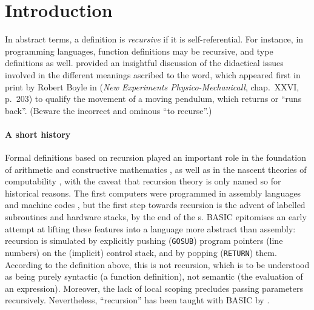 \documentclass[11pt,a4paper]{article}
\newcommand\plang[1]{\textsf{#1}\xspace}
\newcommand\exc[1]{\texttt{\small #1}}
\begin{document}
\section*{Introduction}

In abstract terms, a definition is \emph{recursive} if it is
self\hyp{}referential. For instance, in programming languages,
function definitions may be recursive, and type definitions as
well. \textcite{Giveon:1990} provided an insightful discussion of the
didactical issues involved in the different meanings ascribed to the
word, which appeared first in print by Robert Boyle in
 (\emph{New Experiments Physico\hyp{}Mechanicall},
chap.~XXVI, p.~203) to qualify the movement of a moving pendulum,
which returns or ``runs back''. (Beware the incorrect and ominous ``to
recurse''.)

\paragraph{A short history}

Formal definitions based on recursion played an important role in the
foundation of arithmetic \citep{Peano:1889} and constructive
mathematics \citep{Skolem:1923,Robinson:1947,Robinson:1948}, as well
as in the nascent theories of computability
\citep{Soare:1996,vanOudheusden:2009,Daylight:2010,Lobina:2012}, with
the caveat that recursion theory is only named so for historical
reasons. The first computers were programmed in assembly languages and
machine codes \citep{Knuth:1996}, but the first step towards recursion
is the advent of labelled subroutines and hardware stacks, by the end
of the s. \plang{BASIC} epitomises an early attempt
at lifting these features into a language more abstract than assembly:
recursion is simulated by explicitly pushing (\exc{GOSUB}) program
pointers (line numbers) on the (implicit) control stack, and by
popping (\exc{RETURN}) them. According to the definition above,
this is not recursion, which is to be understood as being purely
syntactic (a function definition), not semantic (the evaluation of an
expression). Moreover, the lack of local scoping precludes passing
parameters recursively. Nevertheless, ``recursion'' has been taught
with \plang{BASIC} by \textcite{Daykin:1974}.
\end{document}
